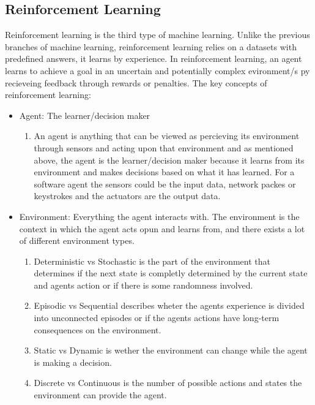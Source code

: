 \subsection{Reinforcement Learning}
Reinforcement learning is the third type of machine learning.
Unlike the previous branches of machine learning,
reinforcement learning relies on a datasets with predefined answers, it learns by experience.
In reinforcement learning, an agent learns to achieve a goal in
an uncertain and potentially complex evironment/s py recieveing feedback
through rewards or penalties. \cite{RL-GeeksForGeeks}
\newline
The key concepts of reinforcement learning: 

\begin{itemize}
    \item Agent: The learner/decision maker 
    \begin{enumerate}
        \item An agent is anything that can be viewed as percieving its environment through
              sensors and acting upon that environment and as mentioned above, the agent is the learner/decision maker because it
              learns from its environment and makes decisions based on what it has learned. 
              For a software agent the sensors could be the input data, network packes or keystrokes
              and the actuators are the output data. \cite{IntelligentAgents}
    \end{enumerate}
    \item Environment: Everything the agent interacts with. The environment is the context in which the agent acts opun and learns from,
          and there exists a lot of different environment types. \cite{IntelligentAgents}
          \begin{enumerate}
            \item Deterministic vs Stochastic is the part of the environment that determines if the next state is completly
                  determined by the current state and agents action or if there is some randomness involved.
            \item Episodic vs Sequential describes wheter the agents experience is divided into unconnected episodes or
                  if the agents actions have long-term consequences on the environment.
            \item Static vs Dynamic is wether the environment can change while the agent is making a decision.
            \item Discrete vs Continuous is the number of possible actions and states the environment can provide the agent.

\end{enumerate}
\end{itemize}

